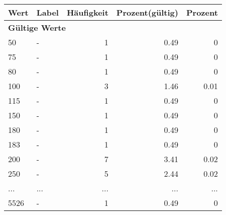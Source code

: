      \begin{longtable}{lXrrr}
     \toprule
     \textbf{Wert} & \textbf{Label} & \textbf{Häufigkeit} & \textbf{Prozent(gültig)} & \textbf{Prozent} \\
     \endhead
     \midrule
     \multicolumn{5}{l}{\textbf{Gültige Werte}}\\
        50 & \multicolumn{1}{X}{-} & %
          \num{1} &
          \num[round-mode=places,round-precision=2]{0.49} &
          \num[round-mode=places,round-precision=2]{0} \\
        75 & \multicolumn{1}{X}{-} & %
          \num{1} &
          \num[round-mode=places,round-precision=2]{0.49} &
          \num[round-mode=places,round-precision=2]{0} \\
        80 & \multicolumn{1}{X}{-} & %
          \num{1} &
          \num[round-mode=places,round-precision=2]{0.49} &
          \num[round-mode=places,round-precision=2]{0} \\
        100 & \multicolumn{1}{X}{-} & %
          \num{3} &
          \num[round-mode=places,round-precision=2]{1.46} &
          \num[round-mode=places,round-precision=2]{0.01} \\
        115 & \multicolumn{1}{X}{-} & %
          \num{1} &
          \num[round-mode=places,round-precision=2]{0.49} &
          \num[round-mode=places,round-precision=2]{0} \\
        150 & \multicolumn{1}{X}{-} & %
          \num{1} &
          \num[round-mode=places,round-precision=2]{0.49} &
          \num[round-mode=places,round-precision=2]{0} \\
        180 & \multicolumn{1}{X}{-} & %
          \num{1} &
          \num[round-mode=places,round-precision=2]{0.49} &
          \num[round-mode=places,round-precision=2]{0} \\
        183 & \multicolumn{1}{X}{-} & %
          \num{1} &
          \num[round-mode=places,round-precision=2]{0.49} &
          \num[round-mode=places,round-precision=2]{0} \\
        200 & \multicolumn{1}{X}{-} & %
          \num{7} &
          \num[round-mode=places,round-precision=2]{3.41} &
          \num[round-mode=places,round-precision=2]{0.02} \\
        250 & \multicolumn{1}{X}{-} & %
          \num{5} &
          \num[round-mode=places,round-precision=2]{2.44} &
          \num[round-mode=places,round-precision=2]{0.02} \\
       ... & ... & ... & ... & ... \\
        5526 & \multicolumn{1}{X}{-} & %
          \num{1} &
          \num[round-mode=places,round-precision=2]{0.49} &
          \num[round-mode=places,round-precision=2]{0} \\


\end{longtable}
